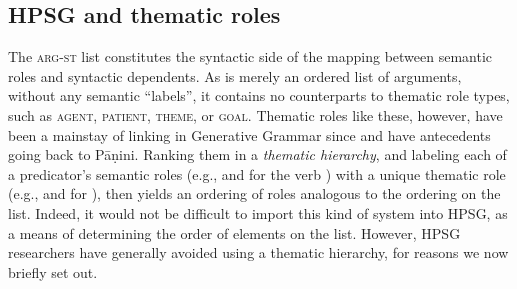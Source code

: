 \documentclass[output=paper
 	        ,biblatex
                ,babelshorthands
                ,newtxmath
                ,draftmode
                ,colorlinks, citecolor=brown
]{langscibook}
\begin{document}
\subsection{HPSG and thematic roles}
\label{thetaroles}

The \textsc{arg-st} list constitutes the syntactic side of the mapping between semantic roles and syntactic dependents.  As \argst is merely an ordered list of arguments, without any semantic ``labels'', it contains no counterparts to thematic role types, such as \textsc{agent}, \textsc{patient}, \textsc{theme}, or \textsc{goal}.  Thematic roles like these, however, have been a mainstay of linking in Generative Grammar since \citet{Fillmore1968} and have antecedents going back to P\={a}\d{n}ini.
Ranking them in a \emph{thematic hierarchy}, and labeling each of a predicator's semantic roles (e.g.,  and  for the verb ) with a unique thematic role (e.g.,  and  for ), then yields an ordering of roles analogous to the ordering on the \argst list.  Indeed, it would not be difficult to import this kind of system into HPSG, as a means of determining the order of elements on the \argst list.  However, HPSG researchers have generally avoided using a thematic hierarchy, for reasons we now briefly set out.
\end{document}
